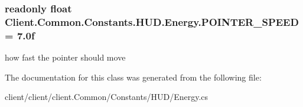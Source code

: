 \subsubsection[{P\+O\+I\+N\+T\+E\+R\+\_\+\+S\+P\+E\+E\+D}]{\setlength{\rightskip}{0pt plus 5cm}readonly float Client.\+Common.\+Constants.\+H\+U\+D.\+Energy.\+P\+O\+I\+N\+T\+E\+R\+\_\+\+S\+P\+E\+E\+D = 7.\+0f\hspace{0.3cm}{\ttfamily [static]}}\label{classClient_1_1Common_1_1Constants_1_1HUD_1_1Energy_aad92c444ade505f6d5b888d1a158df0b}


how fast the pointer should move 



The documentation for this class was generated from the following file\+:\begin{DoxyCompactItemize}
\item 
client/client/client.\+Common/\+Constants/\+H\+U\+D/Energy.\+cs\end{DoxyCompactItemize}
